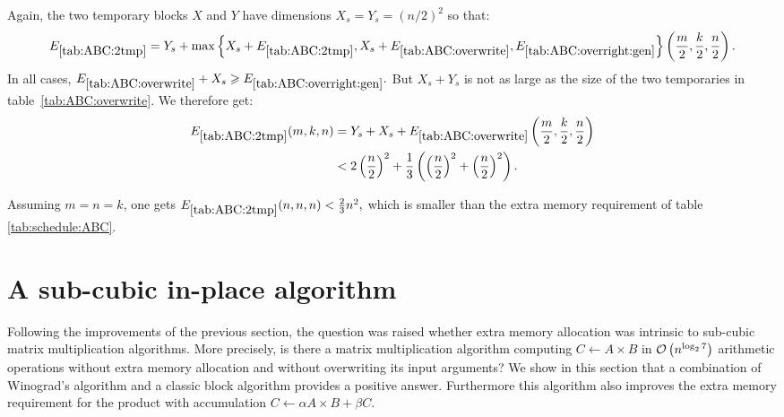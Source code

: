\documentclass{article}
\renewcommand{\geq}{\geqslant}
\begin{document}
Again, the two temporary blocks $X$ and $Y$ have dimensions
$X_s = Y_s = (n/2)^2$ so that:
$$E_{\ref{tab:ABC:2tmp}} =Y_s + \max{\left\{X_s + E_{\ref{tab:ABC:2tmp}} ,X_s + E_{\ref{tab:ABC:overwrite}},E_{\ref{tab:ABC:overright:gen}}\right\}} \left(\frac{m}{2}, \frac{k}{2}, \frac{n}{2}\right).$$
In all cases, $E_{\ref{tab:ABC:overwrite}}+X_s \geq
E_{\ref{tab:ABC:overright:gen}}.$ But $X_s + Y_s$ is not as large as
the size of the two temporaries in table~\ref{tab:ABC:overwrite}. We
therefore get:
\begin{align*}
	E_{\ref{tab:ABC:2tmp}}(m,k,n) = {} & Y_s + X_s + E_{\ref{tab:ABC:overwrite}}\left(\frac{m}{2}, \frac{k}{2}, \frac{n}{2}\right)\\
						   < {} & 2 \left(\frac{n}{2}\right)^2   +  \frac{1}{3} \left( \left(\frac{n}{2}\right)^2 + \left(\frac{n}{2} \right)^2\right).
\end{align*}

Assuming $m=n=k$, one gets  $E_{\ref{tab:ABC:2tmp}}(n,n,n) <\frac{2}{3}n^2,$ which is smaller than the extra memory requirement of table \ref{tab:schedule:ABC}.\\


\section{A sub-cubic in-place algorithm}\label{sec:mix}
Following the improvements of the previous section, the question was raised
whether extra memory allocation was intrinsic to sub-cubic matrix multiplication
algorithms. More precisely, is there a matrix multiplication algorithm computing
$C\leftarrow A\times B$ in
$\mathcal{O}\left(n^{\log_2 7}\right)$ arithmetic operations without extra memory allocation and without
overwriting its input arguments? We show in this section that a combination of Winograd's algorithm and a classic block algorithm provides a positive answer.
Furthermore this algorithm also improves the extra memory requirement for the
product with accumulation $C\leftarrow \alpha A\times B + \beta C$.
\end{document}
